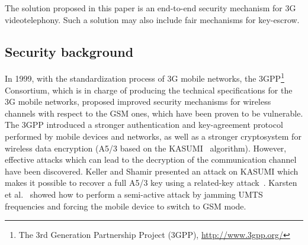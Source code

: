 \documentclass[10pt, conference, compsocconf]{IEEEtran}
\begin{document}

The solution proposed in this paper is an end-to-end security mechanism for 3G videotelephony. Such a solution may also include fair mechanisms for key-escrow.


\subsection{Security background}

In 1999, with the standardization process of 3G mobile networks, the 3GPP\footnote{The 3rd Generation Partnership Project (3GPP), \url{http://www.3gpp.org/}} Consortium, which is in charge of producing the technical specifications for the 3G mobile networks, proposed improved security mechanisms for wireless channels with respect to the GSM ones, which have been proven to be vulnerable.
The 3GPP introduced a stronger authentication and key-agreement protocol performed by mobile devices and networks, as well as a stronger cryptosystem for wireless data encryption (A5/3 based on the KASUMI~\cite{kasumi} algorithm). However, effective attacks which can lead to the decryption of the communication channel have been discovered. Keller and Shamir presented an attack on KASUMI which makes it possible to recover a full A5/3 key using a related-key attack~\cite{A53attack}. Karsten et al.~\cite{srsly} showed how to perform a semi-active attack by jamming UMTS frequencies and forcing the mobile device to switch to GSM mode.

\end{document}
